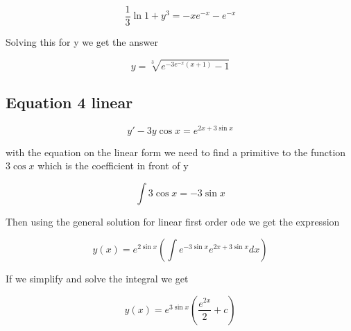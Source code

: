 \documentclass[a4paper]{article}
\begin{document}
\begin{equation}
    \frac{1}{3} \ln{1+y^3} = -xe^{-x} - e^{-x}
\end{equation}

Solving this for y we get the answer

\begin{equation}
    y = \sqrt[3]{e^{-3e^{-x}(x+1)}-1}
\end{equation}

\subsection{Equation 4 linear}

\begin{equation}
    y' - 3y \cos x = e^{2x+3\sin x}
\end{equation}

with the equation on the linear form we need to find a primitive to the function $3\cos{x}$ which is the coefficient in front of y

\begin{equation}
    \int 3\cos{x} = -3 \sin{x}
\end{equation}

Then using the general solution for linear first order ode we get the expression

\begin{equation}
    y(x) = e^{2\sin{x}}\left (\int e^{-3\sin{x}}e^{2x+3\sin{x}}dx \right )
\end{equation}

If we simplify and solve the integral we get

\begin{equation}
    y(x) = e^{3\sin{x}}\left (\frac{e^{2x}}{2} + c \right )
\end{equation}
\end{document}
